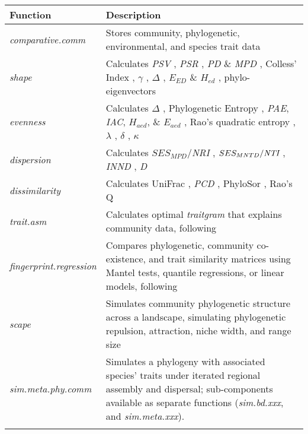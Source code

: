 \documentclass{bioinfo}
\begin{document}
\begin{table*}
  {\begin{tabular}{p{2.5cm} p{15cm}}\toprule
      Function & Description\\\midrule
      \emph{comparative.comm} & Stores community, phylogenetic, environmental, and species trait data\\
      \emph{shape} & Calculates \emph{PSV} \citep{Helmus2007}, \emph{PSR} \citep{Helmus2007}, \emph{PD} \& \emph{MPD} \citep{Faith1992}, Colless' Index \citep{Colless1982}, $\gamma$ \citep{Pybus2000}, $\Delta$ \citep{Warwick1995}, $E_{ED}$ \& $H_{ed}$ \citep{Cadotte2010}, phylo-eigenvectors \citep{Diniz-Filho2011}\\
      \emph{evenness} & Calculates $\Delta$ \citep{Warwick1995}, Phylogenetic Entropy \citep{Allen2009}, \emph{PAE}, \emph{IAC}, $H_{aed}$, \& $E_{aed}$ \citep{Cadotte2010}, Rao's quadratic entropy \citep{Rao1982a}, $\lambda$ \citep{Pagel1999}, $\delta$ \citep{Pagel1999}, $\kappa$ \citep{Pagel1999}\\
      \emph{dispersion} & Calculates $SES_{MPD}$/\emph{NRI} \citep{Webb2002,Kembel2009}, $SES_{MNTD}/\emph{NTI}$ \citep{Webb2002,Kembel2009}, \emph{INND} \citep{Ness2011}, \emph{D} \citep{Fritz2010}\\
      \emph{dissimilarity} &  Calculates UniFrac \citep{Lozupone2005}, \emph{PCD} \citep{Ives2010}, PhyloSor \citep{Bryant2008}, Rao's Q \citep{Rao1982a}\\
      \emph{trait.asm} & Calculates optimal \emph{traitgram} that explains community data, following \citep{Ackerly2009,Cadotte2013}\\
      \emph{fingerprint.regression} & Compares phylogenetic, community co-existence, and trait similarity matrices using Mantel tests, quantile regressions, or linear models, following \citep{Cavender-Bares2004} \\
      \emph{scape} & Simulates community phylogenetic structure across a landscape, simulating phylogenetic repulsion, attraction, niche width, and range size \citep{Helmus2012}\\
      \emph{sim.meta.phy.comm} & Simulates a phylogeny with associated species' traits under iterated regional assembly and dispersal; sub-components available as separate functions  (\emph{sim.bd.xxx}, and \emph{sim.meta.xxx}).\\
      \botrule
\end{tabular}}{}
\end{table*}
\end{document}
